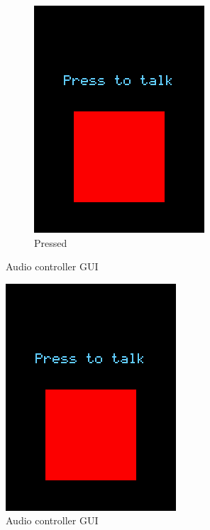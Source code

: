 \documentclass[a4paper,notitlepage,10pt]{report}
\begin{document}
\begin{multicols}{2}
\begin{figure}[H]
\begin{subfigure}[b]{0.4\columnwidth}
		\includegraphics[width=\textwidth]{cap_audio_act}
		\caption{Pressed}
		\label{fig:capAudioAct}
	\end{subfigure}
	\caption{Audio controller GUI}
	\label{fig:capAudio}
\end{figure}
\vspace{6pt}
\else
\begin{figure}[H]
	\centering
	\includegraphics[width=0.4\columnwidth]{cap_audio_act}
	\caption{Audio controller GUI}
	\label{fig:capAudio}
\end{figure}
\vspace{6pt}
\fi


\end{multicols}
\end{document}
